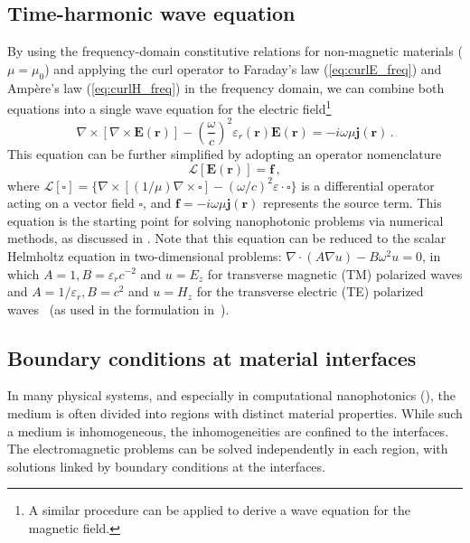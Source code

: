 \subsection*{Time-harmonic wave equation}
By using the frequency-domain constitutive relations for non-magnetic materials ($\mu=\mu_0$) and applying the curl
operator to Faraday's law (\eqref{eq:curlE_freq}) and Ampère's law
(\eqref{eq:curlH_freq}) in the frequency domain,
we can combine both equations into a single wave equation for the electric
field\footnote{A similar procedure can be applied to derive a wave equation
for the magnetic field.}
\begin{equation}\label{eq:wave_eq}
       \nabla \times \left[\nabla \times
\mathbf{E}(\mathbf{r})\right] - \left( \frac{\omega}{c} \right)^2
       \varepsilon_r(\mathbf{r}) \mathbf{E}(\mathbf{r}) = -i\omega \mu
\mathbf{j}(\mathbf{r})\,.
   \end{equation}
This equation can be further simplified by adopting an operator nomenclature
   \begin{equation}\label{eq:maxwell_op}
       \mathcal{L}[\mathbf{E}(\mathbf{r})] = \mathbf{f}\,,
   \end{equation}
where $\mathcal{L}[\square] = \{ \nabla \times \left[(1/\mu) \nabla \times
\mathbf{\square} \right] - \left(\omega/c \right)^2 \varepsilon\cdot \square\} $ is a differential
operator acting on a vector field $\mathbf{\square}$,
and $\mathbf{f} = -i\omega \mu \mathbf{j}(\mathbf{r})$ represents the source
term. This equation is the starting point for solving nanophotonic problems via
numerical methods, as discussed in .
Note that this equation can be reduced to the scalar Helmholtz equation in
two-dimensional problems: $\nabla \cdot(A \nabla u) - B \omega^2 u=0$, in which
$A=1, B=\varepsilon_r c^{-2}$ and $u=E_z$ for
transverse magnetic (TM) polarized waves and $A=1 / \varepsilon_r, B=c^2$ and
$u=H_z$ for the transverse electric (TE) polarized waves~\cite{jensen_review} (as used
in the formulation in~\cite{ownpub2}).

    \subsection*{Boundary conditions at material interfaces}

    In many physical systems, and especially in computational nanophotonics
    (), the medium is often divided into regions with distinct
    material properties. While such a medium is inhomogeneous, the inhomogeneities
    are confined to the interfaces. The electromagnetic problems can be solved
    independently in each region, with solutions linked by boundary conditions at
    the interfaces.
    
